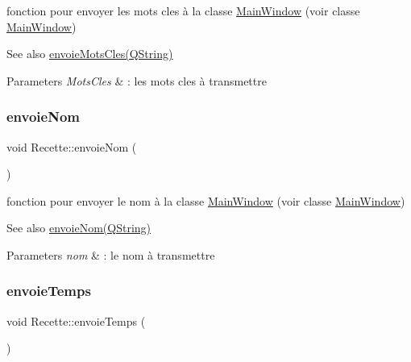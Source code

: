 fonction pour envoyer les mots cles à la classe \hyperlink{classMainWindow}{Main\+Window} (voir classe \hyperlink{classMainWindow}{Main\+Window}) 

\begin{DoxySeeAlso}{See also}
\hyperlink{classRecette_a06b677268e4a76357a008460bf78bf57}{envoie\+Mots\+Cles(\+Q\+String)} 
\end{DoxySeeAlso}

\begin{DoxyParams}{Parameters}
{\em Mots\+Cles} & \+: les mots cles à transmettre \\
\hline
\end{DoxyParams}
\mbox{\label{classRecette_aaf3e04383c78a2cef6af41eac226f07d}} 
\subsubsection{\texorpdfstring{envoie\+Nom}{envoieNom}}
{\footnotesize\ttfamily void Recette\+::envoie\+Nom (\begin{DoxyParamCaption}\item[{Q\+String}]{ }\end{DoxyParamCaption})\hspace{0.3cm}{\ttfamily [signal]}}



fonction pour envoyer le nom à la classe \hyperlink{classMainWindow}{Main\+Window} (voir classe \hyperlink{classMainWindow}{Main\+Window}) 

\begin{DoxySeeAlso}{See also}
\hyperlink{classRecette_aaf3e04383c78a2cef6af41eac226f07d}{envoie\+Nom(\+Q\+String)} 
\end{DoxySeeAlso}

\begin{DoxyParams}{Parameters}
{\em nom} & \+: le nom à transmettre \\
\hline
\end{DoxyParams}
\mbox{\label{classRecette_ad90a82b00fc7f1cc7d66ce54a3c853d8}} 
\subsubsection{\texorpdfstring{envoie\+Temps}{envoieTemps}}
{\footnotesize\ttfamily void Recette\+::envoie\+Temps (\begin{DoxyParamCaption}\item[{Q\+String\+List}]{ }\end{DoxyParamCaption})\hspace{0.3cm}{\ttfamily [signal]}}



